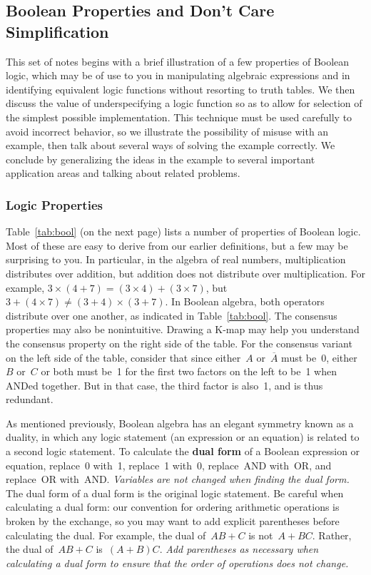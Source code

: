 \classtitle

\subsection{Boolean Properties and Don't Care Simplification}

This set of notes begins with a brief illustration of a few properties
of Boolean logic, which may be of use to you in manipulating algebraic
expressions and in identifying equivalent logic functions without resorting 
to truth tables.
%
We then discuss the value of underspecifying a logic function so as
to allow for selection of the simplest possible implementation.
%
This technique must be used carefully to avoid incorrect behavior,
so we illustrate the possibility of misuse with an example, then
talk about several ways of solving the example correctly.
%
We conclude by generalizing the ideas in the example to several
important application areas and talking about related problems.\\

\subsubsection{Logic Properties}

Table~\ref{tab:bool} (on the next page)
lists a number of properties of Boolean logic.
Most of these are easy to derive from our earlier definitions, but
a few may be surprising to you.  In particular, in the algebra of
real numbers, multiplication
distributes over addition, but addition does not distribute over
multiplication.  For example, $3\times{(4+7)}=(3\times{4})+(3\times{7})$,
but $3+(4\times{7})\not=(3+4)\times{(3+7)}$.  In Boolean algebra,
both operators distribute over one another, as indicated in
Table~\ref{tab:bool}.  The consensus properties may also be 
nonintuitive.  Drawing a \mbox{K-map} may help you understand the
consensus property on the right side of the table.  For the 
consensus variant on the left side of the table,
consider that since either~$A$ or~$\overline{A}$ must be~0,
either~$B$ or~$C$ or both must be~1 for the first two factors on the left
to be~1 when ANDed together.  But in that case, the third factor 
is also~1, and is thus redundant.

As mentioned previously, Boolean
algebra has an elegant symmetry known as a duality, in which any
logic statement (an expression or an equation) is related to a
second logic statement.
%
To calculate the {\bf dual form} of a Boolean expression or equation, 
replace~0 with~1, replace~1 with~0, 
replace~AND with~OR, and
replace~OR with~AND.
%
{\em Variables are not changed when finding the dual form.}
%
The dual form of a dual form is the original logic statement.
%
Be careful when calculating a dual form: our convention for ordering 
arithmetic operations is broken by the exchange, so you may want
to add explicit parentheses before calculating the dual.  For
example, the dual of~$AB+C$ is not~$A+BC$.
Rather, the dual of~$AB+C$ is~$(A+B)C$.
%
{\em Add parentheses as necessary when calculating a dual form to ensure
that the order of operations does not change.}

